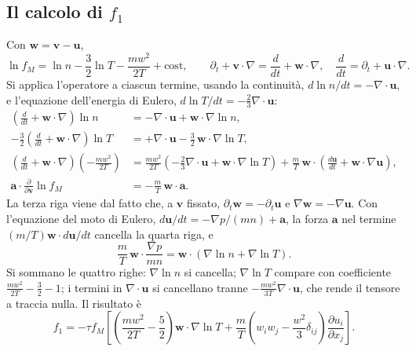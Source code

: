 \subsection{Il calcolo di $f_1$}
Con $\mathbf{w}=\mathbf{v}-\mathbf{u}$,
\begin{equation}
\ln f_M=\ln n-\frac32\ln T-\frac{mw^2}{2T}+\mathrm{cost},\qquad\partial_t+\mathbf{v}\cdot\nabla=\frac{d}{dt}+\mathbf{w}\cdot\nabla,\quad\frac{d}{dt}=\partial_t+\mathbf{u}\cdot\nabla .
\end{equation}
Si applica l'operatore a ciascun termine, usando la continuità, $d\ln n/dt=-\nabla\cdot\mathbf{u}$, e l'equazione dell'energia di Eulero, $d\ln T/dt=-\frac23\nabla\cdot\mathbf{u}$:
\begin{align}
\left(\frac{d}{dt}+\mathbf{w}\cdot\nabla\right)\ln n&=-\nabla\cdot\mathbf{u}+\mathbf{w}\cdot\nabla\ln n,\\
-\frac32\left(\frac{d}{dt}+\mathbf{w}\cdot\nabla\right)\ln T&=+\nabla\cdot\mathbf{u}-\frac32\,\mathbf{w}\cdot\nabla\ln T,\\
\left(\frac{d}{dt}+\mathbf{w}\cdot\nabla\right)\left(-\frac{mw^2}{2T}\right)&=\frac{mw^2}{2T}\left(-\frac23\nabla\cdot\mathbf{u}+\mathbf{w}\cdot\nabla\ln T\right)+\frac mT\,\mathbf{w}\cdot\left(\frac{d\mathbf{u}}{dt}+\mathbf{w}\cdot\nabla\mathbf{u}\right),\\
\mathbf{a}\cdot\frac{\partial}{\partial\mathbf{v}}\ln f_M&=-\frac mT\,\mathbf{w}\cdot\mathbf{a}.
\end{align}
La terza riga viene dal fatto che, a $\mathbf{v}$ fissato, $\partial_t\mathbf{w}=-\partial_t\mathbf{u}$ e $\nabla\mathbf{w}=-\nabla\mathbf{u}$. Con l'equazione del moto di Eulero, $d\mathbf{u}/dt=-\nabla p/(mn)+\mathbf{a}$, la forza $\mathbf{a}$ nel termine $(m/T)\mathbf{w}\cdot d\mathbf{u}/dt$ cancella la quarta riga, e
\begin{equation}
\frac mT\,\mathbf{w}\cdot\frac{\nabla p}{mn}=\mathbf{w}\cdot(\nabla\ln n+\nabla\ln T).
\end{equation}
Si sommano le quattro righe: $\nabla\ln n$ si cancella; $\nabla\ln T$ compare con coefficiente $\frac{mw^2}{2T}-\frac32-1$; i termini in $\nabla\cdot\mathbf{u}$ si cancellano tranne $-\frac{mw^2}{3T}\nabla\cdot\mathbf{u}$, che rende il tensore a traccia nulla. Il risultato è
\begin{equation}
f_1=-\tau f_M\left[\left(\frac{mw^2}{2T}-\frac52\right)\mathbf{w}\cdot\nabla\ln T+\frac mT\left(w_iw_j-\frac{w^2}{3}\delta_{ij}\right)\frac{\partial u_i}{\partial x_j}\right].
\end{equation}
